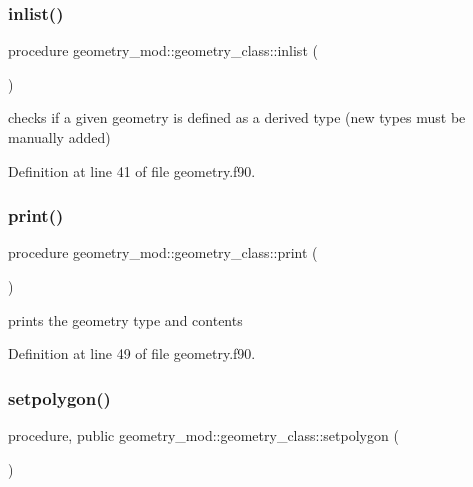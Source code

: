 \subsubsection{\texorpdfstring{inlist()}{inlist()}}
{\footnotesize\ttfamily procedure geometry\+\_\+mod\+::geometry\+\_\+class\+::inlist (\begin{DoxyParamCaption}{ }\end{DoxyParamCaption})\hspace{0.3cm}{\ttfamily [private]}}



checks if a given geometry is defined as a derived type (new types must be manually added) 



Definition at line 41 of file geometry.\+f90.

\mbox{\label{structgeometry__mod_1_1geometry__class_afbb83bea5cd3f73708b448d3c732ea7c}} 
\subsubsection{\texorpdfstring{print()}{print()}}
{\footnotesize\ttfamily procedure geometry\+\_\+mod\+::geometry\+\_\+class\+::print (\begin{DoxyParamCaption}{ }\end{DoxyParamCaption})\hspace{0.3cm}{\ttfamily [private]}}



prints the geometry type and contents 



Definition at line 49 of file geometry.\+f90.

\mbox{\label{structgeometry__mod_1_1geometry__class_ae9157930057bde1cb5e17ac97071015d}} 
\subsubsection{\texorpdfstring{setpolygon()}{setpolygon()}}
{\footnotesize\ttfamily procedure, public geometry\+\_\+mod\+::geometry\+\_\+class\+::setpolygon (\begin{DoxyParamCaption}{ }\end{DoxyParamCaption})}



